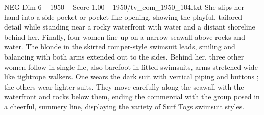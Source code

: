 \begin{textsample}{NEG Dim 6 – 1950 – Score 1.00 – 1950/tv\_com\_1950\_104.txt}
She slips her hand into a side pocket or pocket-like opening, showing the playful, tailored detail while standing near a rocky waterfront with water and a distant shoreline behind her.
Finally, four women line up on a narrow seawall above rocks and water.
The blonde in the skirted romper-style swimsuit leads, smiling and balancing with both arms extended out to the sides.
Behind her, three other women follow in single file, also barefoot in fitted swimsuits, arms stretched wide like tightrope walkers.
One wears the dark suit with vertical piping and buttons ; the others wear lighter suits.
They move carefully along the seawall with the waterfront and rocks below them, ending the commercial with the group posed in a cheerful, summery line, displaying the variety of Surf Togs swimsuit styles.

\end{textsample}
